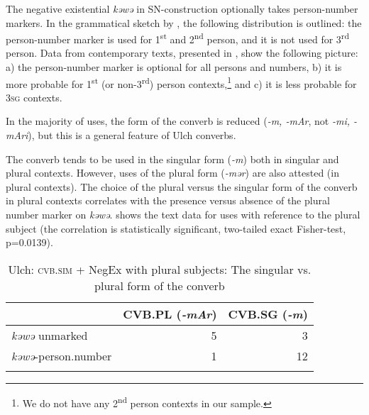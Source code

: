 \documentclass[output=paper,colorlinks,citecolor=brown]{langscibook}
\begin{document}
The negative existential \textit{kəwə} in SN-construction optionally takes person-num\-ber markers. In the grammatical sketch by \citet[65]{petrova1936a}, the following distribution is outlined: the person-number marker is used for 1\textsuperscript{st} and 2\textsuperscript{nd} person, and it is not used for 3\textsuperscript{rd} person. Data from contemporary texts, presented in , show the following picture: a) the person-number marker is optional for all persons and numbers, b) it is more probable for 1\textsuperscript{st} (or non-3\textsuperscript{rd}) person contexts,\footnote{We do not have any 2\textsuperscript{nd} person contexts in our sample.} and c) it is less probable for \textsc{3sg} contexts.

\begin{table}
    \caption{Ulch: Person-number markers on \textit{kəwə} in SN-construction}
    \label{tab:T6}
\end{table}

In the majority of uses, the form of the converb is reduced (\textit{-m, -mAr}, not \textit{-mi, -mAri}), but this is a general feature of Ulch converbs.

The converb tends to be used in the singular form (\textit{-m}) both in singular and plural contexts. However, uses of the plural form (\textit{-mər}) are also attested (in plural contexts). The choice of the plural versus the singular form of the converb in plural contexts correlates with the presence versus absence of the plural number marker on \textit{kəwə}.  shows the text data for uses with reference to the plural subject (the correlation is statistically significant, two-tailed exact Fisher-test, p=0.0139).

\begin{table}
    \caption{Ulch: \textsc{cvb.sim} + NegEx with plural subjects: The singular vs. plural form of the converb}
    \label{tab:T7}
    \begin{tabularx}{.8\textwidth}{Xrr}
    \lsptoprule
     & CVB.PL (\textit{-mAr}) & CVB.SG (\textit{-m}) \\ \midrule
    \textit{kəwə} unmarked & 5 & 3 \\
    \textit{kəwə}-person.number & 1 & 12 \\ \lspbottomrule
    \end{tabularx}
\end{table}
\end{document}
